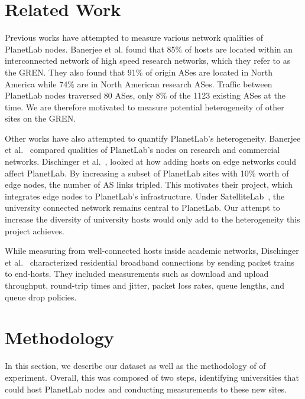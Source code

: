 \documentclass{sig-alternate-10pt}
\begin{document}
\section{Related Work} 


Previous works have attempted to measure various network qualities of PlanetLab
nodes. Banerjee et al.\cite{banerjee:connectivity} found that 85\% of hosts are
located within an interconnected network of high speed research networks, which they 
refer to as the GREN. They also found that 91\% of origin ASes are located in North 
America while 74\% are in North American research ASes. Traffic between PlanetLab nodes
traversed 80 ASes, only 8\% of the 1123 existing ASes at the time. We are therefore
motivated to measure potential heterogeneity of other sites on the GREN.

Other works have also attempted to quantify PlanetLab’s heterogeneity. Banerjee
et al.~\cite{banerjee:connectivity} compared qualities of PlanetLab’s nodes on
research and commercial networks. Dischinger et
al.~\cite{dischinger:satellitelab}, looked at how adding hosts on edge networks
could affect PlanetLab. By increasing a subset of PlanetLab sites with 10\%
worth of edge nodes, the number of AS links tripled. This motivates their
project, which integrates edge nodes to PlanetLab’s infrastructure. Under
SatelliteLab~\cite{dischinger:satellitelab}, the university connected network
remains central to PlanetLab.  Our attempt to increase the diversity of
university hosts would only add to the heterogeneity this project achieves.

While measuring from well-connected hosts inside academic networks, Dischinger
et al.~\cite{dischinger:residential} characterized residential broadband
connections by sending packet trains to end-hosts. They included measurements
such as download and upload throughput, round-trip times and jitter, packet
loss rates, queue lengths, and queue drop policies. 



\section{Methodology}

In this section, we describe our dataset as well as the methodology of of
experiment.  Overall, this was composed of two steps, identifying universities
that could host PlanetLab nodes and conducting measurements to these new sites.
\end{document}
